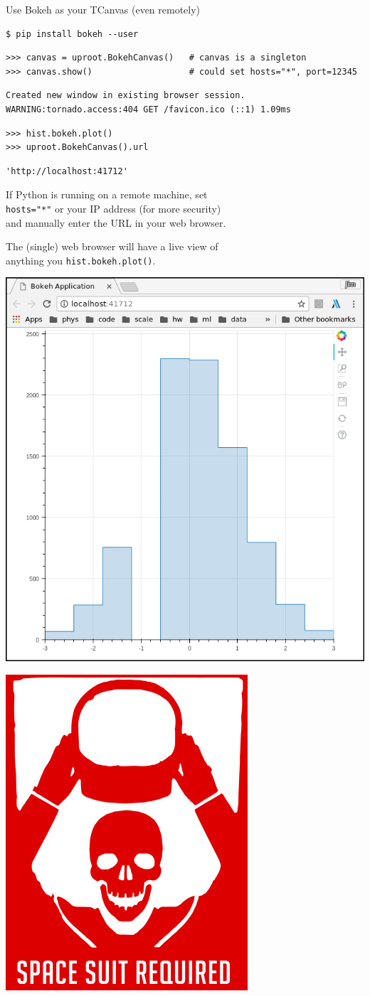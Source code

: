 \documentclass[aspectratio=169]{beamer}
\begin{document}
\begin{frame}[fragile]{Use Bokeh as your TCanvas (even remotely)}
\vspace{0.25 cm}
\small
\begin{verbatim}
$ pip install bokeh --user
\end{verbatim}
\begin{verbatim}
>>> canvas = uproot.BokehCanvas()   # canvas is a singleton
>>> canvas.show()                   # could set hosts="*", port=12345
\end{verbatim}
\begin{verbatim}
Created new window in existing browser session.
WARNING:tornado.access:404 GET /favicon.ico (::1) 1.09ms
\end{verbatim}
\begin{verbatim}
>>> hist.bokeh.plot()
>>> uproot.BokehCanvas().url
\end{verbatim}
\begin{verbatim}
'http://localhost:41712'
\end{verbatim}

\vspace{0.2 cm}
If Python is running on a remote machine, set \\
{\tt hosts="*"} or your IP address (for more security) \\
and manually enter the URL in your web browser.

\vspace{0.2 cm}
The (single) web browser will have a live view of \\
anything you {\tt hist.bokeh.plot()}.

\vspace{-4.25 cm}
\hfill \includegraphics[height=4.5 cm]{bokeh_plot.png}\hspace{1 cm}

\vspace{-2.1 cm}
\hfill \includegraphics[width=1.5 cm]{danger.png}\hspace{-0.9 cm}
\vspace{3 cm}
\end{frame}
\end{document}

